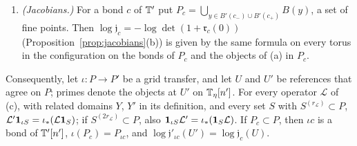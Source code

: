 \begin{lemma}
\begin{enumerate}[label=(\alph*)]
\begin{itemize}
  \end{itemize}
\item \emph{(Jacobians.)} For a bond $c$ of $\mathbb T'$ put $P_c=\bigcup_{y\in B'(c_-)\cup B'(c_+)}B(y)$, a set of fine points. Then $\log\mathfrak j_c=-\log\det(1+\mathfrak r_c(0))$ (Proposition~\ref{prop:jacobians}(b)) is given by the same formula on every torus in the configuration on the bonds of $P_c$ and the objects of (a) in $P_c$.
\end{enumerate}
Consequently, let $\iota:P\to P'$ be a grid transfer, and let $U$ and $U'$ be references that agree on $P$; primes denote the objects at $U'$ on $\mathbb T_\eta[n']$. For every operator $\mathcal L$ of (c), with related domains $Y$, $Y'$ in its definition, and every set $S$ with $S^{(r_{\mathcal L})}\subset P$, $\mathcal L'\mathbf 1_{\iota S}=\iota_*(\mathcal L\mathbf 1_S)$; if $S^{(2r_{\mathcal L})}\subset P$, also $\mathbf 1_{\iota S}\mathcal L'=\iota_*(\mathbf 1_S\mathcal L)$. If $P_c\subset P$, then $\iota c$ is a bond of $\mathbb T'[n']$, $\iota(P_c)=P_{\iota c}$, and $\log\mathfrak j'_{\iota c}(U')=\log\mathfrak j_c(U)$.
\end{lemma}

